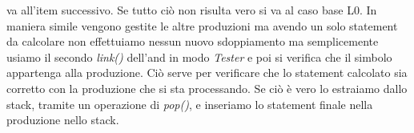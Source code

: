 va all'item successivo. Se tutto ciò non risulta vero si va al caso base L0. In maniera simile vengono gestite le altre produzioni ma avendo un solo statement da calcolare non effettuiamo nessun nuovo sdoppiamento ma semplicemente usiamo il secondo \textit{link()} dell'and in modo \textit{Tester} e poi si verifica che il simbolo appartenga alla produzione. Ciò serve per verificare che lo statement calcolato sia corretto con la produzione che si sta processando. Se ciò è vero lo estraiamo dallo stack, tramite un operazione di \textit{pop()}, e inseriamo lo statement finale nella produzione nello stack.